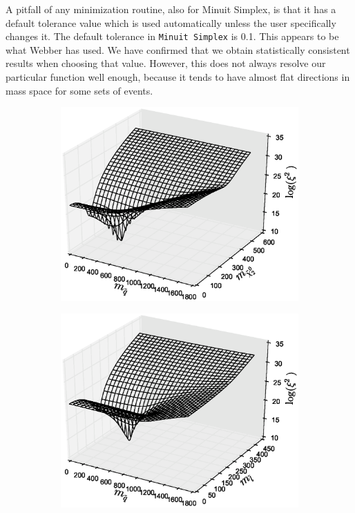 \documentclass[twoside,english]{uiofysmaster}
\begin{document}
A pitfall of any minimization routine, also for Minuit Simplex, is that it has a default tolerance value which is used automatically unless the user specifically changes it. The default tolerance in {\tt Minuit Simplex} is 0.1. This appears to be what Webber has used. We have confirmed that we obtain statistically consistent results when choosing that value. However, this does not always resolve our particular function well enough, because it tends to have almost flat directions in mass space for some sets of events.
\begin{figure}[hbt]
	\centering
	\begin{subfigure}[b]{0.49\textwidth}
		\includegraphics[width=\textwidth,clip=true,trim=60 40 50 40]{figures/webber_rec_table/xisq_surface_herwigpp_squarkneutralino2.eps} 
		\caption{}
		\label{fig:3D_masses1}
	\end{subfigure}
	\begin{subfigure}[b]{0.49\textwidth}
		\includegraphics[width=\textwidth,clip=true,trim=60 40 50 40]{figures/webber_rec_table/xisq_surface_herwigpp_squarkslepton.eps} 
		\caption{}
		\label{fig:3D_masses2}
	\end{subfigure}


\end{figure}
\end{document}
